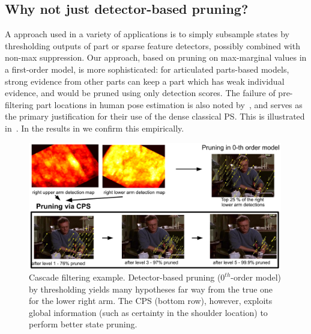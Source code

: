 \subsection{Why not just detector-based pruning?} A \naive approach used in a 
variety of applications is to simply subsample states by thresholding outputs 
of part or sparse feature detectors, possibly combined with non-max 
suppression.  Our approach, based on pruning on max-marginal values in a 
first-order model, is more sophisticated: for articulated parts-based models, 
strong evidence from other parts can keep a part which has weak individual 
evidence, and would be pruned using only detection scores.  The failure of 
pre-filtering  part locations in human pose estimation is also noted 
by~\citet{andriluka09}, and serves as the primary justification for their use 
of the dense classical PS.  This is illustrated in~.  
In the results in  we confirm this empirically.

\begin{figure}[tb]
\begin{center}
\includegraphics[width=0.99\textwidth]{figs/cascade-pruning.pdf}
\caption[Cascade filtering example]{Cascade filtering example. Detector-based 
pruning ($0^{th}$-order model) by thresholding yields many hypotheses far way from 
the true one for the lower right arm. The CPS (bottom row), however, exploits 
global information (such as certainty in the shoulder location) to perform 
better state pruning.}
\label{fig:cascade-pruning}
\end{center}
\end{figure}


